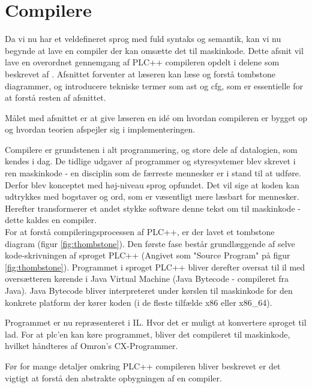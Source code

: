 \section{Compilere}
Da vi nu har et veldefineret sprog med fuld syntaks og semantik, kan vi nu begynde at lave en compiler der kan omsætte det til maskinkode. Dette afsnit vil lave en overordnet gennemgang af PLC++ compileren opdelt i delene som beskrevet af \textcite{CraftingCompiler_2009}. 
Afsnittet forventer at læseren kan læse og forstå tombstone diagrammer, og introducere tekniske termer som \acrlong{ast} og \acrlong{cfg}, som er essentielle for at forstå resten af afsnittet. 

Målet med afsnittet er at give læseren en idé om hvordan compileren er bygget op og hvordan teorien afspejler sig i implementeringen.

\bigskip

\noindent Compilere er grundstenen i alt programmering, og store dele af datalogien, som kendes i dag. De tidlige udgaver af programmer og styresystemer blev skrevet i ren maskinkode - en disciplin som de færreste mennesker er i stand til at udføre. Derfor blev konceptet med høj-niveau sprog opfundet. Det vil sige at koden kan udtrykkes med bogstaver og ord, som er væsentligt mere læsbart for mennesker. Herefter transformerer et andet stykke software denne tekst om til maskinkode - dette kaldes en compiler. \\

\noindent For at forstå compileringsprocessen af PLC++, er der lavet et tombstone diagram (figur \ref{fig:thombstone}). Den første fase består grundlæggende af selve kode-skrivningen af sproget PLC++ (Angivet som "Source Program" på figur \ref{fig:thombstone}). Programmet i sproget PLC++ bliver derefter oversat til \gls{il} med oversætteren kørende i Java Virtual Machine (Java Bytecode - compileret fra Java). Java Bytecode bliver interpreteret under kørslen til maskinkode for den konkrete platform der kører koden (i de fleste tilfælde x86 eller x86\_64).

Programmet er nu repræsenteret i IL. Hvor det er muligt at konvertere sproget til \gls{lad}. For at \gls{plc}’en kan køre programmet, bliver det compileret til maskinkode, hvilket håndteres af Omron’s CX-Programmer.


\noindent Før for mange detaljer omkring PLC++ compileren bliver beskrevet er det vigtigt at forstå den abstrakte opbygningen af en compiler. %

